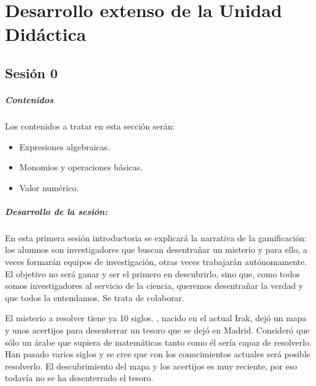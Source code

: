 \chapter{Desarrollo extenso de la Unidad Didáctica}


\label{app:todo}





\section{Sesión 0}


\paragraph{Contenidos}

Los contenidos a tratar en esta sección serán:

\begin{itemize}
\item Expresiones algebraicas.
\item Monomios y operaciones básicas.
\item Valor numérico.
\end{itemize}

\paragraph{Desarrollo de la sesión: }

En esta primera sesión introductoria se explicará la narrativa de la gamificación: 
%
los alumnos son investigadores que buscan desentrañar un misterio y para ello, a veces formarán equipos de investigación, otras veces trabajarán autónomamente.
%
El objetivo no será ganar y ser el primero en descubrirlo, sino que, como todos somos investigadores al servicio de la ciencia, queremos desentrañar la verdad y que todos la entendamos.
%
Se trata de colaborar.

El misterio a resolver tiene ya 10 siglos.
%
\Arab, nacido en el actual Irak, dejó un mapa y unos acertijos para desenterrar un tesoro que se dejó en Madrid.
%
Consideró que sólo un árabe que supiera de matemáticas tanto como él sería capaz de resolverlo.
%
Han pasado varios siglos y se cree que con los conocimientos actuales será posible resolverlo.
%
El descubrimiento del mapa y los acertijos es muy reciente, por eso todavía no se ha desenterrado el tesoro.

